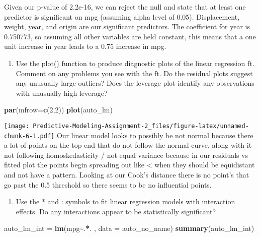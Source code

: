 \documentclass[
]{article}
\newenvironment{Shaded}{\begin{snugshade}}{\end{snugshade}}
\newcommand{\AttributeTok}[1]{\textcolor[rgb]{0.13,0.29,0.53}{#1}}
\newcommand{\DecValTok}[1]{\textcolor[rgb]{0.00,0.00,0.81}{#1}}
\newcommand{\FunctionTok}[1]{\textcolor[rgb]{0.13,0.29,0.53}{\textbf{#1}}}
\newcommand{\NormalTok}[1]{#1}
\newcommand{\OtherTok}[1]{\textcolor[rgb]{0.56,0.35,0.01}{#1}}
\newcommand{\SpecialCharTok}[1]{\textcolor[rgb]{0.81,0.36,0.00}{\textbf{#1}}}
\providecommand{\tightlist}{%
  \setlength{\itemsep}{0pt}\setlength{\parskip}{0pt}}
\begin{document}
Given our p-value of 2.2e-16, we can reject the null and state that at
least one predictor is significant on mpg (assuming alpha level of
0.05). Displacement, weight, year, and origin are our significant
predictors. The coefficient for year is 0.750773, so assuming all other
variables are held constant, this means that a one unit increase in year
leads to a 0.75 increase in mpg.

\begin{enumerate}
\def\labelenumi{(\alph{enumi})}
\setcounter{enumi}{3}
\tightlist
\item
  Use the plot() function to produce diagnostic plots of the linear
  regression ft. Comment on any problems you see with the ft. Do the
  residual plots suggest any unusually large outliers? Does the leverage
  plot identify any observations with unusually high leverage?
\end{enumerate}

\begin{Shaded}
\begin{Highlighting}[]
\FunctionTok{par}\NormalTok{(}\AttributeTok{mfrow=}\FunctionTok{c}\NormalTok{(}\DecValTok{2}\NormalTok{,}\DecValTok{2}\NormalTok{))}
\FunctionTok{plot}\NormalTok{(auto\_lm)}
\end{Highlighting}
\end{Shaded}

\texttt{[image: Predictive-Modeling-Assignment-2\_files/figure-latex/unnamed-chunk-6-1.pdf]}
Our linear model looks to possibly be not normal because there a lot of
points on the top end that do not follow the normal curve, along with it
not following homoskedasticity / not equal variance because in our
residuals vs fitted plot the points begin spreading out like \textless{}
when they should be equidistant and not have a pattern. Looking at our
Cook's distance there is no point's that go past the 0.5 threshold so
there seems to be no influential points.

\begin{enumerate}
\def\labelenumi{(\alph{enumi})}
\setcounter{enumi}{4}
\tightlist
\item
  Use the * and : symbols to fit linear regression models with
  interaction effects. Do any interactions appear to be statistically
  significant?
\end{enumerate}

\begin{Shaded}
\begin{Highlighting}[]
\NormalTok{auto\_lm\_int }\OtherTok{=} \FunctionTok{lm}\NormalTok{(mpg}\SpecialCharTok{\textasciitilde{}}\NormalTok{.}\SpecialCharTok{*}\NormalTok{. , }\AttributeTok{data =}\NormalTok{ auto\_no\_name)}
\FunctionTok{summary}\NormalTok{(auto\_lm\_int)}
\end{Highlighting}
\end{Shaded}
\end{document}
